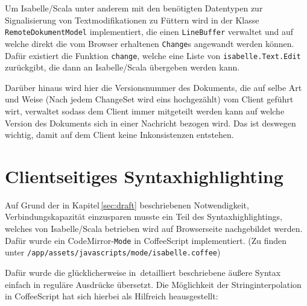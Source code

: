 Um Isabelle/Scala unter anderem mit den benötigten Datentypen zur Signalisierung von
Textmodifikationen zu Füttern wird in der Klasse \texttt{RemoteDokumentModel} implementiert, die
einen \texttt{LineBuffer} verwaltet und auf welche direkt die vom Browser erhaltenen
\texttt{Change}s angewandt werden können. Dafür existiert die Funktion \texttt{change}, welche eine
Liste von \texttt{isabelle.Text.Edit} zurückgibt, die dann an Isabelle/Scala übergeben werden kann.

Darüber hinaus wird hier die Versionsnummer des Dokuments, die auf selbe Art und Weise (Nach jedem
ChangeSet wird eins hochgezählt) vom Client geführt wirt, verwaltet sodass dem Client immer
mitgeteilt werden kann auf welche Version des Dokuments sich in einer Nachricht bezogen wird. Das
ist deswegen wichtig, damit auf dem Client keine Inkonsistenzen entstehen.

\section{Clientseitiges Syntaxhighlighting}
\label{sec:syntax}

Auf Grund der in Kapitel\,\ref{sec:draft} beschriebenen Notwendigkeit, Verbindungskapazität
einzusparen musste ein Teil des Syntaxhighlightings, welches von Isabelle/Scala betrieben wird auf
Browserseite nachgebildet werden. Dafür wurde ein CodeMirror-\texttt{Mode} in CoffeeScript
implementiert. (Zu finden unter \texttt{/app/assets/javascripts/mode/isabelle.coffee})

Dafür wurde die glücklicherweise in\,\cite{isabelle} detailliert beschriebene äußere Syntax einfach
in reguläre Ausdrücke übersetzt. Die Möglichkeit der Stringinterpolation in CoffeeScript hat sich
hierbei als Hilfreich heausgestellt:

